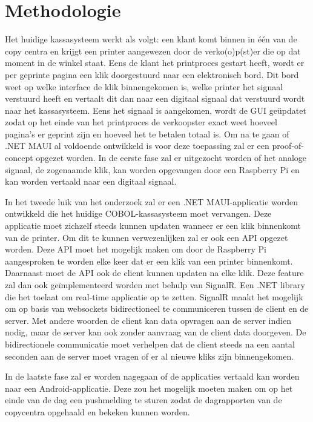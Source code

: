 \section{Methodologie}%
\label{sec:methodologie}

Het huidige kassasysteem werkt als volgt: een klant komt binnen in één van de copy centra en krijgt een printer aangewezen door de verko(o)p(st)er die op dat moment in de winkel staat. Eens de klant het printproces gestart heeft, wordt er per geprinte pagina een klik doorgestuurd naar een elektronisch bord. Dit bord weet op welke interface de klik binnengekomen is, welke printer het signaal verstuurd heeft en vertaalt dit dan naar een digitaal signaal dat verstuurd wordt naar het kassasysteem. Eens het signaal is aangekomen, wordt de GUI geüpdatet zodat op het einde van het printproces de verkoopster exact weet hoeveel pagina’s er geprint zijn en hoeveel het te betalen totaal is.
Om na te gaan of .NET MAUI al voldoende ontwikkeld is voor deze toepassing zal er een proof-of-concept opgezet worden. In de eerste fase zal er uitgezocht worden of het analoge signaal, de zogenaamde klik, kan worden opgevangen door een Raspberry Pi en kan worden vertaald naar een digitaal signaal.

In het tweede luik van het onderzoek zal er een .NET MAUI-applicatie worden ontwikkeld die het huidige COBOL-kassasysteem moet vervangen. Deze applicatie moet zichzelf steeds kunnen updaten wanneer er een klik binnenkomt van de printer. Om dit te kunnen verwezenlijken zal er ook een API opgezet worden. Deze API moet het mogelijk maken om door de Raspberry Pi aangesproken te worden elke keer dat er een klik van een printer binnenkomt. Daarnaast moet de API ook de client kunnen updaten na elke klik. Deze feature zal dan ook geïmplementeerd worden met behulp van SignalR. Een .NET library die het toelaat om real-time applicatie op te zetten. SignalR maakt het mogelijk om op basis van websockets bidirectioneel te communiceren tussen de client en de server. Met andere woorden de client kan data opvragen aan de server indien nodig, maar de server kan ook zonder aanvraag van de client data doorgeven. De bidirectionele communicatie moet verhelpen dat de client steeds na een aantal seconden aan de server moet vragen of er al nieuwe kliks zijn binnengekomen.

In de laatste fase zal er worden nagegaan of de applicaties vertaald kan worden naar een Android-applicatie. Deze zou het mogelijk moeten maken om op het einde van de dag een pushmelding te sturen zodat de dagrapporten van de copycentra opgehaald en bekeken kunnen worden.

